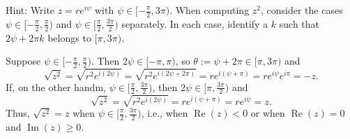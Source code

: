 \documentclass[12pt, addpoints]{exam}
\renewcommand{\Re}{\operatorname{Re}}
\renewcommand{\Im}{\operatorname{Im}}
\begin{document}
\begin{questions}
    Hint: Write $z=re^{i\psi}$ with $\psi\in[-\frac\pi2,3\pi)$. When computing $z^2$, consider the cases $\psi\in[-\frac\pi2,\frac\pi2)$ and $\psi\in[\frac\pi2,\frac{3\pi}2)$ separately.
    In each case, identify a $k$ such that $2\psi + 2\pi k$ belongs to $[\pi, 3\pi)$.

    \begin{solution}
        Suppose $\psi\in[-\frac\pi2,\frac\pi2)$.
        Then $2\psi\in[-\pi, \pi)$, so $\theta := \psi + 2\pi\in [\pi, 3\pi)$ and
        \[
            \sqrt{z^2} = \sqrt{r^2e^{i(2\psi)}} = \sqrt{r^2e^{i(2\psi+2\pi)}}=re^{i(\psi + \pi)}=re^{i\psi}e^{i\pi}=-z.
        \]
        If, on the other handm, $\psi\in[\frac\pi2,\frac{3\pi}2)$, then $2\psi\in [\pi, \frac{3\pi}2)$ and
        \[
            \sqrt{z^2} = \sqrt{r^2e^{i(2\psi)}} =re^{i(\psi + \pi)}=re^{i\psi}=z.
        \]
        Thus, $\sqrt{z^2}=z$ when $\psi\in [\frac\pi2,\frac{3\pi}2)$, i.e., when $\Re(z)<0$ or when $\Re(z)=0$ and $\Im(z)\geq 0$.
    \end{solution}
\end{questions}
\end{document}
